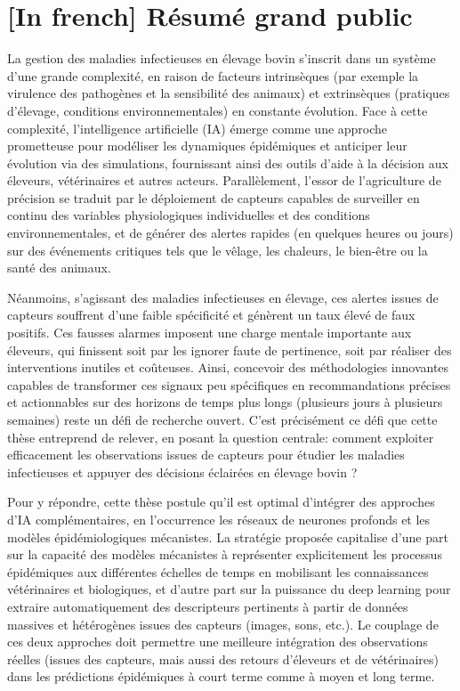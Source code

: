 \section{[In french] Résumé grand public}

La gestion des maladies infectieuses en élevage bovin s’inscrit dans un système d’une grande complexité, en raison de facteurs intrinsèques (par exemple la virulence des pathogènes et la sensibilité des animaux) et extrinsèques (pratiques d’élevage, conditions environnementales) en constante évolution. Face à cette complexité, l’intelligence artificielle (IA) émerge comme une approche prometteuse pour modéliser les dynamiques épidémiques et anticiper leur évolution via des simulations, fournissant ainsi des outils d’aide à la décision aux éleveurs, vétérinaires et autres acteurs. Parallèlement, l’essor de l’agriculture de précision se traduit par le déploiement de capteurs capables de surveiller en continu des variables physiologiques individuelles et des conditions environnementales, et de générer des alertes rapides (en quelques heures ou jours) sur des événements critiques tels que le vêlage, les chaleurs, le bien-être ou la santé des animaux.

Néanmoins, s’agissant des maladies infectieuses en élevage, ces alertes issues de capteurs souffrent d’une faible spécificité et génèrent un taux élevé de faux positifs. Ces fausses alarmes imposent une charge mentale importante aux éleveurs, qui finissent soit par les ignorer faute de pertinence, soit par réaliser des interventions inutiles et coûteuses. Ainsi, concevoir des méthodologies innovantes capables de transformer ces signaux peu spécifiques en recommandations précises et actionnables sur des horizons de temps plus longs (plusieurs jours à plusieurs semaines) reste un défi de recherche ouvert. C’est précisément ce défi que cette thèse entreprend de relever, en posant la question centrale: comment exploiter efficacement les observations issues de capteurs pour étudier les maladies infectieuses et appuyer des décisions éclairées en élevage bovin ?

Pour y répondre, cette thèse postule qu’il est optimal d’intégrer des approches d’IA complémentaires, en l’occurrence les réseaux de neurones profonds et les modèles épidémiologiques mécanistes. La stratégie proposée capitalise d’une part sur la capacité des modèles mécanistes à représenter explicitement les processus épidémiques aux différentes échelles de temps en mobilisant les connaissances vétérinaires et biologiques, et d’autre part sur la puissance du deep learning pour extraire automatiquement des descripteurs pertinents à partir de données massives et hétérogènes issues des capteurs (images, sons, etc.). Le couplage de ces deux approches doit permettre une meilleure intégration des observations réelles (issues des capteurs, mais aussi des retours d’éleveurs et de vétérinaires) dans les prédictions épidémiques à court terme comme à moyen et long terme. 

